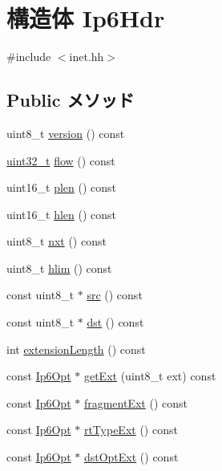 \hypertarget{structNet_1_1Ip6Hdr}{
\section{構造体 Ip6Hdr}
\label{structNet_1_1Ip6Hdr}
}


{\ttfamily \#include $<$inet.hh$>$}\subsection*{Public メソッド}
\begin{DoxyCompactItemize}
\item 
uint8\_\-t \hyperlink{structNet_1_1Ip6Hdr_aa3599d88ee3f2dd92bec653b3a607b6b}{version} () const 
\item 
\hyperlink{Type_8hh_a435d1572bf3f880d55459d9805097f62}{uint32\_\-t} \hyperlink{structNet_1_1Ip6Hdr_abd45f80ddf5023fd59eeb0812111da65}{flow} () const 
\item 
uint16\_\-t \hyperlink{structNet_1_1Ip6Hdr_a86c05206b7d72010f7438756e85fb9ec}{plen} () const 
\item 
uint16\_\-t \hyperlink{structNet_1_1Ip6Hdr_a99ca1c2b90035435849dd875b138bdad}{hlen} () const 
\item 
uint8\_\-t \hyperlink{structNet_1_1Ip6Hdr_aa9a773e8c63669710e2900218d27c6ef}{nxt} () const 
\item 
uint8\_\-t \hyperlink{structNet_1_1Ip6Hdr_a12dbfe3b5265507c192dfb7654aed123}{hlim} () const 
\item 
const uint8\_\-t $\ast$ \hyperlink{structNet_1_1Ip6Hdr_ac89e62d050ac7229700d8a59b0e2b29d}{src} () const 
\item 
const uint8\_\-t $\ast$ \hyperlink{structNet_1_1Ip6Hdr_afbd6887ef6e6210e797a3a2dbc71be8e}{dst} () const 
\item 
int \hyperlink{structNet_1_1Ip6Hdr_a8d453fe4c2ad6428fd6c6ec4c3aa38e2}{extensionLength} () const 
\item 
const \hyperlink{structNet_1_1Ip6Opt}{Ip6Opt} $\ast$ \hyperlink{structNet_1_1Ip6Hdr_a260c2330d0e33c41c2f44baf15f1badc}{getExt} (uint8\_\-t ext) const 
\item 
const \hyperlink{structNet_1_1Ip6Opt}{Ip6Opt} $\ast$ \hyperlink{structNet_1_1Ip6Hdr_a8c75a1a568b300b2ba9952ccdc5bd66e}{fragmentExt} () const 
\item 
const \hyperlink{structNet_1_1Ip6Opt}{Ip6Opt} $\ast$ \hyperlink{structNet_1_1Ip6Hdr_a3a8a479e7dbca9c422af60d927be851c}{rtTypeExt} () const 
\item 
const \hyperlink{structNet_1_1Ip6Opt}{Ip6Opt} $\ast$ \hyperlink{structNet_1_1Ip6Hdr_a02acb1122703acb86b2730fce2642676}{dstOptExt} () const 

\end{DoxyCompactItemize}
